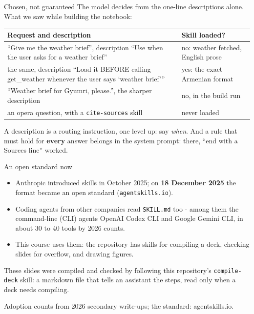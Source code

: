 \documentclass[aspectratio=169]{beamer}
\newcommand{\trapbox}[1]{%
  \begin{tcolorbox}[colback=armred!8, colframe=armred, boxrule=0.6pt, arc=2pt]
  #1
  \end{tcolorbox}}
\newcommand{\takebox}[1]{%
  \begin{tcolorbox}[colback=paramgreen!8, colframe=paramgreen, boxrule=0.6pt, arc=2pt]
  #1
  \end{tcolorbox}}
\newcommand{\src}[1]{{\scriptsize\color{gray} #1}}
\begin{document}
\begin{frame}{Chosen, not guaranteed}
  \vspace{0.3em}
  {\small The model decides from the one-line descriptions alone. What we saw while building the notebook:}

  \vspace{0.3em}
  \begin{center}
  \footnotesize
  \begin{tabular}{>{\raggedright\arraybackslash}p{}>{\raggedright\arraybackslash}p{}}
    \toprule
    \textbf{Request and description} & \textbf{Skill loaded?} \\
    \midrule
    ``Give me the weather brief'', description ``Use when the user asks for a weather brief'' & no: weather fetched,
      English prose \\
    the same, description ``Load it BEFORE calling get\_weather whenever the user says `weather brief''' & yes:
      the exact Armenian format \\
    ``Weather brief for Gyumri, please.'', the sharper description & no, in the build run \\
    an opera question, with a \texttt{cite-sources} skill & never loaded \\
    \bottomrule
  \end{tabular}
  \end{center}

  \vspace{0.3em}
  \trapbox{\small A description is a routing instruction, one level up: say \emph{when}. And a rule that must
  hold for \textbf{every} answer belongs in the system prompt: there, ``end with a Sources line'' worked.}
\end{frame}

\begin{frame}{An open standard now}
  \vspace{0.4em}
  \begin{itemize}
    \item Anthropic introduced skills in October 2025; on \textbf{18 December 2025} the format became an open
      standard (\texttt{agentskills.io}).
    \item Coding agents from other companies read \texttt{SKILL.md} too - among them the command-line (CLI) agents
      OpenAI Codex CLI and Google Gemini CLI, in about 30 to 40 tools by 2026 counts.
    \item This course uses them: the repository has skills for compiling a deck, checking slides for overflow,
      and drawing figures.
  \end{itemize}

  \vspace{0.5em}
  \takebox{These slides were compiled and checked by following this repository's \texttt{compile-deck} skill: a
  markdown file that tells an assistant the steps, read only when a deck needs compiling.}

  \vspace{0.2em}
  \src{Adoption counts from 2026 secondary write-ups; the standard: agentskills.io.}
\end{frame}
\end{document}
